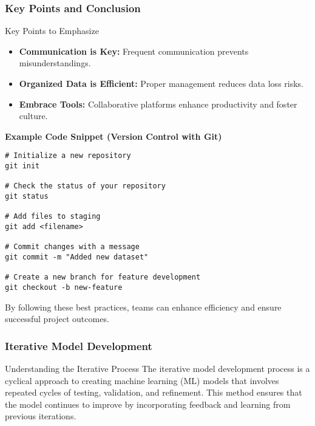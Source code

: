 \documentclass[aspectratio=169]{beamer}
\begin{document}
\begin{frame}[fragile]
    \frametitle{Key Points and Conclusion}
    \begin{block}{Key Points to Emphasize}
        \begin{itemize}
            \item \textbf{Communication is Key:} Frequent communication prevents misunderstandings.
            \item \textbf{Organized Data is Efficient:} Proper management reduces data loss risks.
            \item \textbf{Embrace Tools:} Collaborative platforms enhance productivity and foster culture.
        \end{itemize}
    \end{block}
    
    \vspace{0.3cm}
    \textbf{Example Code Snippet (Version Control with Git)}
    \begin{lstlisting}
# Initialize a new repository
git init

# Check the status of your repository
git status

# Add files to staging
git add <filename>

# Commit changes with a message
git commit -m "Added new dataset"

# Create a new branch for feature development
git checkout -b new-feature
    \end{lstlisting}

    \vspace{0.5cm}
    By following these best practices, teams can enhance efficiency and ensure successful project outcomes.
\end{frame}

\begin{frame}[fragile]
    \frametitle{Iterative Model Development}
    \begin{block}{Understanding the Iterative Process}
        The iterative model development process is a cyclical approach to creating machine learning (ML) models that involves repeated cycles of testing, validation, and refinement. This method ensures that the model continues to improve by incorporating feedback and learning from previous iterations.
    \end{block}
\end{frame}
\end{document}
